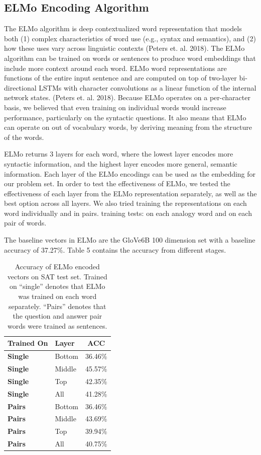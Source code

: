 \documentclass[11pt]{article}
\begin{document}
\subsection{ELMo Encoding Algorithm}

The ELMo algorithm is deep contextualized word representation that models both
(1) complex characteristics of word use (e.g., syntax and semantics), and (2)
how these uses vary across linguistic contexts (Peters et. al. 2018). The ELMo
algorithm can be trained on words or sentences to produce word embeddings that
include more context around each word. ELMo word representations are functions
of the entire input sentence and are computed on top of two-layer bi-directional
LSTMs with character convolutions as a linear function of the internal network
states. (Peters et. al. 2018). Because ELMo operates on a per-character basis,
we believed that even training on individual words would increase performance,
particularly on the syntactic questions. It also means that ELMo can operate on
out of vocabulary words, by deriving meaning from the structure of the words.

ELMo returns 3 layers for each word, where the lowest layer encodes more
syntactic information, and the highest layer encodes more general, semantic
information. Each layer of the ELMo encodings can be used as the embedding for
our problem set. In order to test the effectiveness of ELMo, we tested the
effectiveness of each layer from the ELMo representation separately, as well as
the best option across all layers. We also tried training the representations on
each word individually and in pairs. training tests: on each analogy word and on
each pair of words.

The baseline vectors in ELMo are the GloVe6B 100 dimension set with a baseline
accuracy of 37.27\%. Table 5 contains the accuracy from different stages.

\begin{table}[h]
\begin{center}
\begin{tabular}{|l|lc|}
\hline\bf Trained On & Layer & ACC \\\hline
\bf Single & Bottom & 36.46\% \\
\bf Single & Middle & 45.57\% \\
\bf Single & Top & 42.35\% \\
\bf Single & All & 41.28\% \\
\bf Pairs & Bottom & 36.46\% \\
\bf Pairs & Middle & 43.69\% \\
\bf Pairs & Top & 39.94\% \\
\bf Pairs & All & 40.75\% \\\hline
\end{tabular}
\end{center}
\caption{\label{font-table} Accuracy of ELMo encoded vectors on SAT test set. Trained on ``single'' denotes that ELMo was trained on each word separately. ``Pairs'' denotes that the question and answer pair words were trained as sentences.}
\end{table}
\end{document}
